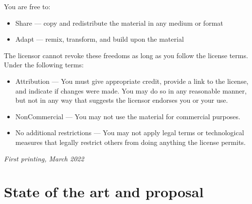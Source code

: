 \documentclass[
	12pt, %
	fleqn, %
	a4paper, %
	oneside, %
]{LegrandOrangeBook}
\begin{document}
\noindent 
You are free to:
\begin{itemize}
\item Share — copy and redistribute the material in any medium or format
\item Adapt — remix, transform, and build upon the material
\end{itemize}
The licensor cannot revoke these freedoms as long as you follow the license terms.\\
Under the following terms:
\begin{itemize}
\item Attribution — You must give appropriate credit, provide a link to the license, and indicate if changes were made. You may do so in any reasonable manner, but not in any way that suggests the licensor endorses you or your use.
\item NonCommercial — You may not use the material for commercial purposes.
\item No additional restrictions — You may not apply legal terms or technological measures that legally restrict others from doing anything the license permits.
\end{itemize}
\noindent \textit{First printing, March 2022} %


\pagestyle{empty} %

\tableofcontents %

\listoffigures %

\listoftables %

\pagestyle{fancy} %

\cleardoublepage %


\part{State of the art and proposal}
\end{document}
